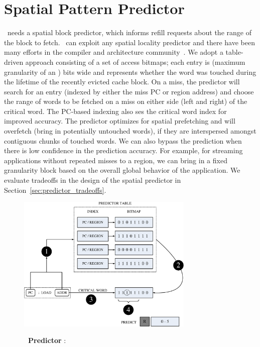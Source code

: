\section{Spatial Pattern Predictor}
\label{sec:spatial_pattern_predictor}

\AC\ needs a spatial block predictor, which  informs refill requests about the range of the block to fetch. \AC\ can exploit any spatial locality predictor and there have been many efforts in the compiler and architecture community~\cite{Chilimbi-Hill-pldi-1999, kumar-isca-1998, pujara-hpca-2006,chen-hpca-2004}. We adopt a table-driven approach consisting of a set of access bitmaps; each entry is  (maximum granularity of an \AB{}) bits wide and represents whether the word was touched during the lifetime of the recently evicted cache block. On a miss, the predictor will search for an entry (indexed by either the miss PC or region address) and choose the range of words to be fetched on a miss on either side (left and right) of the critical word. The PC-based indexing also ses the critical word index for improved accuracy. The predictor optimizes for spatial prefetching and will  overfetch (bring in potentially untouched words), if they are interspersed amongst contiguous chunks of touched words. We can also bypass the prediction when there is low confidence in the prediction accuracy. For example, for streaming applications without repeated misses to a region, we can bring in a fixed granularity block based on the overall global behavior of the application. We evaluate tradeoffs in the design of the spatial predictor in Section~\ref{sec:predictor_tradeoffs}.

\begin{figure}[h]
  \centering
  \includegraphics[width=0.75\textwidth]{files/Figures/06-Predictor.pdf}
  \\
  \caption[Amoeba-Cache Predictor]{\textbf{\AC\ Predictor} :  }
  \label{fig:predictor}
\end{figure}

